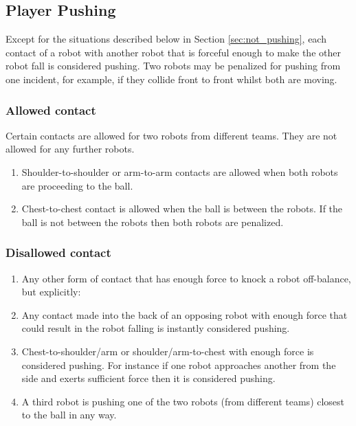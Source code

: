 \documentclass[12pt]{article}
\begin{document}

\subsection{Player Pushing}
\label{sec:player_pushing}

Except for the situations described below in Section \ref{sec:not_pushing}, each contact of a robot with another robot that is forceful enough to make the other robot fall is considered pushing. Two robots may be penalized for pushing from one incident, for example, if they collide front to front whilst both are moving.

\subsubsection{Allowed contact}

Certain contacts are allowed for two robots from different teams. They are not allowed for any further robots.

\begin{enumerate}

\item Shoulder-to-shoulder or arm-to-arm contacts are allowed when both robots are proceeding to the ball.

\item Chest-to-chest contact is allowed when the ball is between the robots. If the ball is not between the robots then both robots are penalized.

\end{enumerate}

\subsubsection{Disallowed contact}

\begin{enumerate}

\item Any other form of contact that has enough force to knock a robot off-balance, but explicitly:

\item Any contact made into the back of an opposing robot with enough force that could result in the robot falling is instantly considered pushing.

\item Chest-to-shoulder/arm or shoulder/arm-to-chest with enough force is considered pushing. For instance if one robot approaches another from the side and exerts sufficient force then it is considered pushing.

\item A third robot is pushing one of the two robots (from different teams) closest to the ball in any way.

\end{enumerate}
\end{document}
